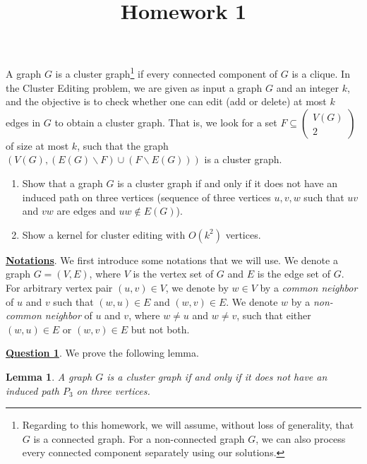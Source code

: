 \documentclass{article}
\title{Homework 1}
\newtheorem{lemma}{Lemma}
\begin{document}
\maketitle

A graph \(G\) is a cluster graph\footnote{Regarding to this homework, we will assume, without loss of generality, that \(G\) is a connected graph. For a non-connected graph \(G\), we can also process every connected component separately using our solutions.} if every connected component of \(G\) is a clique. In the Cluster Editing problem, we are given as input a graph \(G\) and an integer \(k\), and the objective is to check whether one can edit (add or delete) at most \(k\) edges in \(G\) to obtain a cluster graph. That is, we look for a set \(F \subseteq
\left(
\begin{array}{c}
V(G)\\
2
\end{array}
\right)\) of size at most \(k\), such that the graph \((V(G), (E(G)\backslash F) \cup (F\backslash E(G)))\) is a cluster graph.

\begin{enumerate}
\item Show that a graph \(G\) is a cluster graph if and only if it does not have an induced path on three vertices (sequence of three vertices \(u, v, w\) such that \(uv\) and \(vw\) are edges and \(uw \notin E(G)\)).
\item Show a kernel for cluster editing with \(O(k^2)\) vertices.
\end{enumerate}

\noindent \underline{\textbf{Notations}}. We first introduce some notations that we will use. We denote a graph \(G = (V,E)\), where \(V\) is the vertex set of \(G\) and \(E\) is the edge set of \(G\). For arbitrary vertex pair \((u,v) \in V\), we denote by \(w \in V\) by a \textit{common neighbor} of \(u\) and \(v\) such that \((w,u) \in E\) and \((w,v) \in E\). We denote \(w\) by a \textit{non-common neighbor} of \(u\) and \(v\), where \(w \neq u\) and \(w \neq v\), such that either \((w,u) \in E\) or \((w,v) \in E\) but not both.

\noindent \underline{\textbf{Question 1}}. We prove the following lemma.
\begin{lemma}
A graph \(G\) is a cluster graph if and only if it does not have an induced path \(P_3\) on three vertices.
\end{lemma}
\end{document}
